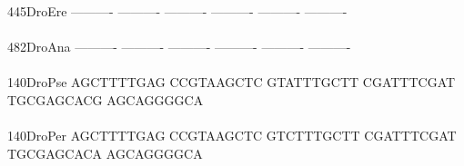 \documentclass[11pt,twoside,reqno,a4paper]{article}
\begin{document}
{445\hspace*{2\charwidth}DroEre	----------	----------	----------	----------	----------	----------	\\
\hspace*{5\charwidth}\hspace*{7\charwidth}\hspace*{1\charwidth}\hspace*{1\charwidth}\hspace*{1\charwidth}\hspace*{1\charwidth}\hspace*{1\charwidth}\hspace*{1\charwidth}\\
482\hspace*{2\charwidth}DroAna	----------	----------	----------	----------	----------	----------	\\
\hspace*{5\charwidth}\hspace*{7\charwidth}\hspace*{1\charwidth}\hspace*{1\charwidth}\hspace*{1\charwidth}\hspace*{1\charwidth}\hspace*{1\charwidth}\hspace*{1\charwidth}\\
140\hspace*{2\charwidth}DroPse	AGCTTTTGAG	CCGTAAGCTC	GTATTTGCTT	CGATTTCGAT	TGCGAGCACG	AGCAGGGGCA	\\
\hspace*{5\charwidth}\hspace*{7\charwidth}\hspace*{1\charwidth}\hspace*{1\charwidth}\hspace*{1\charwidth}\hspace*{1\charwidth}\hspace*{1\charwidth}\hspace*{1\charwidth}\\
140\hspace*{2\charwidth}DroPer	AGCTTTTGAG	CCGTAAGCTC	GTCTTTGCTT	CGATTTCGAT	TGCGAGCACA	AGCAGGGGCA	\\
\hspace*{5\charwidth}\hspace*{7\charwidth}\hspace*{1\charwidth}\hspace*{1\charwidth}\hspace*{1\charwidth}\hspace*{1\charwidth}\hspace*{1\charwidth}\hspace*{1\charwidth}\\
}
\end{document}
